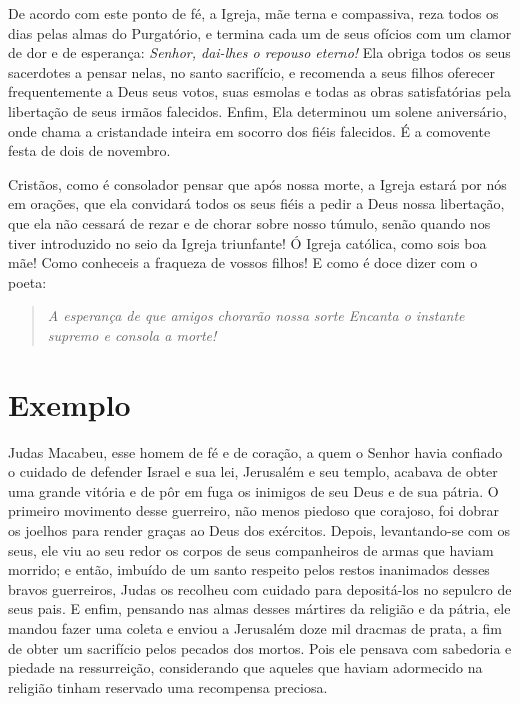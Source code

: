 De acordo com este ponto de fé, a Igreja, mãe terna e compassiva, reza todos os dias pelas almas do Purgatório, e termina cada um de seus ofícios com um clamor de dor e de esperança: \textit{Senhor, dai-lhes o repouso eterno!} Ela obriga todos os seus sacerdotes a pensar nelas, no santo sacrifício, e recomenda a seus filhos oferecer frequentemente a Deus seus votos, suas esmolas e todas as obras satisfatórias pela libertação de seus irmãos falecidos. Enfim, Ela determinou um solene aniversário, onde chama a cristandade inteira em socorro dos fiéis falecidos. É a comovente festa de dois de novembro.

Cristãos, como é consolador pensar que após nossa morte, a Igreja estará por nós em orações, que ela convidará todos os seus fiéis a pedir a Deus nossa libertação, que ela não cessará de rezar e de chorar sobre nosso túmulo, senão quando nos tiver introduzido no seio da Igreja triunfante! Ó Igreja católica, como sois boa mãe! Como conheceis a fraqueza de vossos filhos! E como é doce dizer com o poeta:

\begin{quote}
\textit{\textit{A esperança de que amigos chorarão nossa sorte} \textit{Encanta o instante supremo e consola a morte!}}
\end{quote}


\section*{Exemplo}

Judas Macabeu, esse homem de fé e de coração, a quem o Senhor havia confiado o cuidado de defender Israel e sua lei, Jerusalém e seu templo, acabava de obter uma grande vitória e de pôr em fuga os inimigos de seu Deus e de sua pátria. O primeiro movimento desse guerreiro, não menos piedoso que corajoso, foi dobrar os joelhos para render graças ao Deus dos exércitos. Depois, levantando-se com os seus, ele viu ao seu redor os corpos de seus companheiros de armas que haviam morrido; e então, imbuído de um santo respeito pelos restos inanimados desses bravos guerreiros, Judas os recolheu com cuidado para depositá-los no sepulcro de seus pais. E enfim, pensando nas almas desses mártires da religião e da pátria, ele mandou fazer uma coleta e enviou a Jerusalém doze mil dracmas de prata, a fim de obter um sacrifício pelos pecados dos mortos. Pois ele pensava com sabedoria e piedade na ressurreição, considerando que aqueles que haviam adormecido na religião tinham reservado uma recompensa preciosa.


